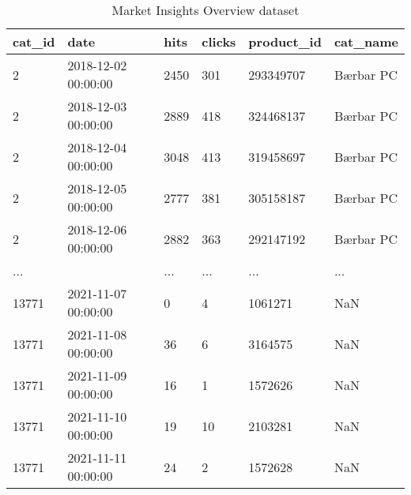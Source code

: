 \begin{table}[htbp]
\centering
\caption{Market Insights Overview dataset}
\label{table:market_insights_overview_11-12-21}
\begin{tabular}{llllll}
\toprule
cat\_id &                date & hits & clicks & product\_id &  cat\_name \\
\midrule
     2 & 2018-12-02 00:00:00 & 2450 &    301 &  293349707 & Bærbar PC \\
     2 & 2018-12-03 00:00:00 & 2889 &    418 &  324468137 & Bærbar PC \\
     2 & 2018-12-04 00:00:00 & 3048 &    413 &  319458697 & Bærbar PC \\
     2 & 2018-12-05 00:00:00 & 2777 &    381 &  305158187 & Bærbar PC \\
     2 & 2018-12-06 00:00:00 & 2882 &    363 &  292147192 & Bærbar PC \\
   ... &                     &  ... &    ... &        ... &       ... \\
 13771 & 2021-11-07 00:00:00 &    0 &      4 &    1061271 &       NaN \\
 13771 & 2021-11-08 00:00:00 &   36 &      6 &    3164575 &       NaN \\
 13771 & 2021-11-09 00:00:00 &   16 &      1 &    1572626 &       NaN \\
 13771 & 2021-11-10 00:00:00 &   19 &     10 &    2103281 &       NaN \\
 13771 & 2021-11-11 00:00:00 &   24 &      2 &    1572628 &       NaN \\
\bottomrule
\end{tabular}
\end{table}
